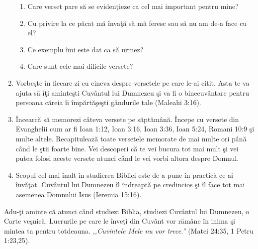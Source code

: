 \begin{enumerate}
\begin{enumerate}
		\item Care verset pare să se evidenţieze ca cel mai important pentru mine?
		
		\item Cu privire la ce păcat mă învaţă să mă feresc sau să nu am de-a face cu el?
		
		\item Ce exemplu îmi este dat ca să urmez?
		
		\item Care sunt cele mai dificile versete?
	\end{enumerate}
	
	\item Vorbeşte în fiecare zi cu cineva despre versetele pe care le-ai citit. Asta te va ajuta să îţi aminteşti Cuvântul lui Dumnezeu şi va fi o binecuvântare pentru persoana căreia îi împărtăşeşti gândurile tale (Maleahi 3:16). 
	
	\item Încearcă să memorezi câteva versete pe săptămână. Începe cu versete din Evanghelii cum ar fi Ioan 1:12, Ioan 3:16, Ioan 3:36, Ioan 5:24, Romani 10:9 şi multe altele. Recapitulează toate versetele memorate de mai multe ori până când le ştii foarte bine. Vei descoperi că te vei bucura tot mai mult şi vei putea folosi aceste versete atunci când le vei vorbi altora despre Domnul.
	
	\item Scopul cel mai înalt în studierea Bibliei este de a pune în practică ce ai învăţat. Cuvântul lui Dumnezeu îl îndreaptă pe credincios şi îl face tot mai asemenea Domnului Isus (Ieremia 15:16).                                       
	
\end{enumerate}

Adu-ţi aminte că atunci când studiezi Biblia, studiezi Cuvântul lui Dumnezeu, o Carte veşnică. Lucrurile pe care le înveţi din Cuvânt vor rămâne în inima şi mintea ta pentru totdeauna. \textit{,,Cuvintele Mele nu vor trece.''} (Matei 24:35, 1 Petru 1:23,25).
